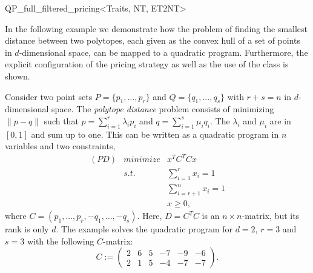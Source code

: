 \begin{ccRefClass}{QP_full_filtered_pricing<Traits, NT, ET2NT>}
\ccImplementation
\ccIndexImplementation


\ccExample
In the following example we demonstrate how the problem of finding the
smallest distance between two polytopes, each given as the convex hull of a
set of points in
$d$-dimensional space, can be mapped to a quadratic program. Furthermore,
the explicit configuration of the pricing strategy as well as
the use of the class  is shown.  

Consider two point sets $P=\{p_{1}, \ldots, p_{r} \}$ and
$Q=\{q_{1}, \ldots, q_{s} \}$ with $r+s=n$ in $d$-dimensional space. The
\emph{polytope distance} problem consists of minimizing $\|p-q\|$ such that
$p=\sum_{i=1}^{r}\lambda_{i}p_{i}$ and $q=\sum_{i=1}^{s}\mu_{i}q_{i}$. The
$\lambda_{i}$ and $\mu_{i}$ are in $\left[0, 1\right]$ and sum up to one.
This can be written as a quadratic program in $n$ variables and two constraints,
\begin{eqnarray*}
(PD) & minimize & x^{T}C^{T}Cx  \\
     & s.t.     & \sum_{i=1}^{r}x_{i} = 1 \\
     &          & \sum_{i=r+1}^{n}x_{i} = 1 \\
     &          & x \geq 0,
\end{eqnarray*}
where $C=(p_{1}, \ldots , p_{r}, -q_{1}, \ldots, -q_{s})$. Here, $D=C^{T}C$ is an
$n \times n$-matrix, but its rank is only $d$. The example solves the quadratic
program for $d=2$, $r=3$ and $s=3$ with the following $C$-matrix:
\[
C:=
\left(\begin{array}{cccccc}
        2 & 6 & 5 & -7 & -9 & -6 \\
	2 & 1 & 5 & -4 & -7 & -7
      \end{array}
\right).
\]


\end{ccRefClass}


